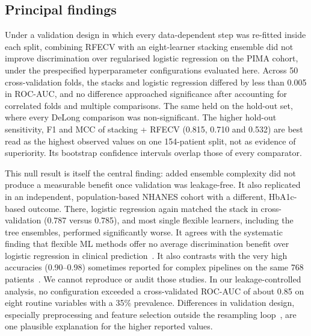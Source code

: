 \documentclass[preprint,12pt,authoryear=false]{elsarticle}
\begin{document}
\subsection{Principal findings}
Under a validation design in which every data-dependent step was re-fitted inside each split, combining RFECV with an eight-learner stacking ensemble did not improve discrimination over regularised logistic regression on the PIMA cohort, under the prespecified hyperparameter configurations evaluated here. Across 50 cross-validation folds, the stacks and logistic regression differed by less than 0.005 in ROC-AUC, and no difference approached significance after accounting for correlated folds and multiple comparisons. The same held on the hold-out set, where every DeLong comparison was non-significant. The higher hold-out sensitivity, F1 and MCC of stacking + RFECV (0.815, 0.710 and 0.532) are best read as the highest observed values on one 154-patient split, not as evidence of superiority. Its bootstrap confidence intervals overlap those of every comparator.

This null result is itself the central finding: added ensemble complexity did not produce a measurable benefit once validation was leakage-free. It also replicated in an independent, population-based NHANES cohort with a different, HbA1c-based outcome. There, logistic regression again matched the stack in cross-validation (0.787 versus 0.785), and most single flexible learners, including the tree ensembles, performed significantly worse. It agrees with the systematic finding that flexible ML methods offer no average discrimination benefit over logistic regression in clinical prediction~\cite{christodoulou2019}. It also contrasts with the very high accuracies (0.90--0.98) sometimes reported for complex pipelines on the same 768 patients~\cite{zhou2023boruta,shams2025rfegru}. We cannot reproduce or audit those studies. In our leakage-controlled analysis, no configuration exceeded a cross-validated ROC-AUC of about 0.85 on eight routine variables with a 35\% prevalence. Differences in validation design, especially preprocessing and feature selection outside the resampling loop~\cite{ambroise2002selection,kapoor2023leakage}, are one plausible explanation for the higher reported values.
\end{document}
